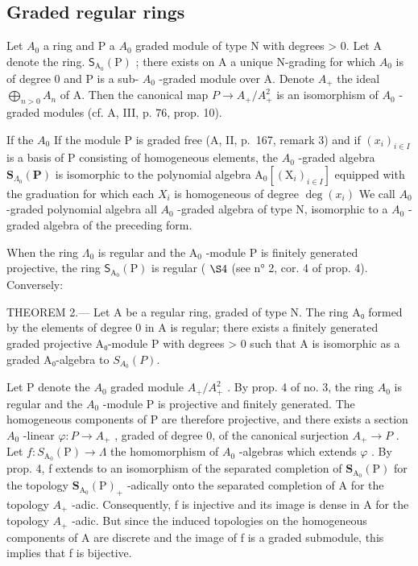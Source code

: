 \subsection{Graded regular rings}

Let \(A_{0}\) a ring and P a \(A_{0}\) graded module of type N with degrees \textgreater{} 0. Let A denote the ring. \(\mathsf{S}_{\mathrm{A}_{0}}(\mathrm{P})\) ; there exists on A a unique N-grading for which \(A_{0}\) is of degree 0 and P is a sub- \(A_{0}\) -graded module over A. Denote \(A_{+}\) the ideal \(\bigoplus_{n>0} A_{n}\) of A. Then the canonical map \(P \longrightarrow A_{+}/A_{+}^{2}\) is an isomorphism of \(A_{0}\) -graded modules (cf. A, III, p. 76, prop. 10).

If the \(A_{0}\) If the module P is graded free (A, II, p.~167, remark 3) and if \((x_{i})_{i\in I}\) is a basis of P consisting of homogeneous elements, the \(A_{0}\) -graded algebra \(\mathbf{S}_{\Lambda_{0}}(\mathbf{P})\) is isomorphic to the polynomial algebra \(\mathrm{A}_{0}[(\mathrm{X}_{i})_{i\in I}]\) equipped with the graduation for which each \(X_{i}\) is homogeneous of degree \(\deg(x_{i})\) We call \(A_{0}\) -graded polynomial algebra all \(A_{0}\) -graded algebra of type N, isomorphic to a \(A_{0}\) -graded algebra of the preceding form.

When the ring \(\Lambda_0\) is regular and the \(\mathrm{A}_0\) -module P is finitely generated projective, the ring \(\mathsf{S}_{\mathrm{A}_0}(\mathrm{P})\) is regular ( \(\S 4\) (see n° 2, cor. 4 of prop. 4). Conversely:

THEOREM 2.--- Let A be a regular ring, graded of type N. The ring A₀ formed by the elements of degree 0 in A is regular; there exists a finitely generated graded projective A₀-module P with degrees \textgreater{} 0 such that A is isomorphic as a graded A₀-algebra to \(S_{A_{0}}(P)\).

Let P denote the \(A_{0}\) graded module \(A_{+}/A_{+}^{2}\) . By prop. 4 of no. 3, the ring \(A_{0}\) is regular and the \(A_{0}\) -module P is projective and finitely generated. The homogeneous components of P are therefore projective, and there exists a section \(A_{0}\) -linear \(\varphi: P \to A_{+}\) , graded of degree 0, of the canonical surjection \(A_{+} \to P\) . Let \(f: S_{\mathrm{A}_{0}}(\mathrm{P}) \longrightarrow \Lambda\) the homomorphism of \(A_{0}\) -algebras which extends \(\varphi\) . By prop. 4, f extends to an isomorphism of the separated completion of \(\mathbf{S}_{\mathrm{A}_{0}}(\mathrm{P})\) for the topology \(\mathbf{S}_{\mathrm{A}_{0}}(\mathrm{P})_{+}\) -adically onto the separated completion of A for the topology \(A_{+}\) -adic. Consequently, f is injective and its image is dense in A for the topology \(A_{+}\) -adic. But since the induced topologies on the homogeneous components of A are discrete and the image of f is a graded submodule, this implies that f is bijective.

